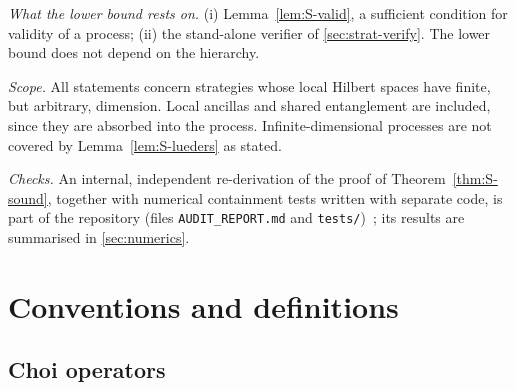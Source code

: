 \documentclass[aps,pra,onecolumn,notitlepage,superscriptaddress,longbibliography,nofootinbib,11pt]{revtex4-2}
\theoremstyle{remark}
\newcommand{\file}[1]{\texttt{#1}}
\begin{document}
\emph{What the lower bound rests on.} (i) Lemma~\ref{lem:S-valid}, a sufficient condition for validity of a process; (ii) the stand-alone verifier of \ref{sec:strat-verify}. The lower bound does not depend on the hierarchy.

\emph{Scope.} All statements concern strategies whose local Hilbert spaces have finite, but arbitrary, dimension. Local ancillas and shared entanglement are included, since they are absorbed into the process. Infinite-dimensional processes are not covered by Lemma~\ref{lem:S-lueders} as stated.

\emph{Checks.} An internal, independent re-derivation of the proof of Theorem~\ref{thm:S-sound}, together with numerical containment tests written with separate code, is part of the repository (files \file{AUDIT\_REPORT.md} and \file{tests/})~\cite{repo}; its results are summarised in \ref{sec:numerics}.

\section{Conventions and definitions}\label{sec:conventions}

\subsection{Choi operators}
\end{document}
